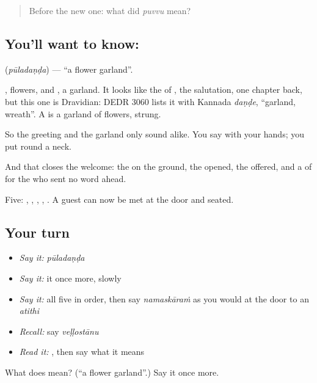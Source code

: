 \begin{quote}
Before the new one: what did \emph{puvvu} mean?
\end{quote}

\subsection*{You'll want to know: }
\textbf{} (\emph{pūladaṇḍa}) — \textquotedblleft{}a flower garland\textquotedblright{}.

, flowers, and , a garland. It looks like the  of , the salutation, one chapter back, but this one is Dravidian: DEDR 3060 lists it with Kannada \emph{daṇḍe}, \textquotedblleft{}garland, wreath\textquotedblright{}. A  is a garland of flowers, strung.

So the greeting and the garland only sound alike. You say  with your hands; you put  round a neck.

And that closes the welcome: the  on the ground, the  opened, the  offered, and a  of  for the  who sent no word ahead.

\begin{grammarlens}[title={What you've built}]
Five: , , , , . A guest can now be met at the door and seated.
\end{grammarlens}

\subsection*{Your turn}
\begin{itemize}
\raggedright
  \item \emph{Say it:} \emph{pūladaṇḍa}
  \item \emph{Say it:} it once more, slowly
  \item \emph{Say it:} all five in order, then say \emph{namaskāraṁ} as you would at the door to an \emph{atithi}
  \item \emph{Recall:} say \emph{veḷḷostānu}
  \item \emph{Read it:} \textbf{}, then say what it means
\end{itemize}

\begin{tcolorbox}[breakable,colback=teal!4,colframe=teal!35!black,title={Before you move on}]
What does  mean? (\textquotedblleft{}a flower garland\textquotedblright{}.) Say it once more.
\end{tcolorbox}
